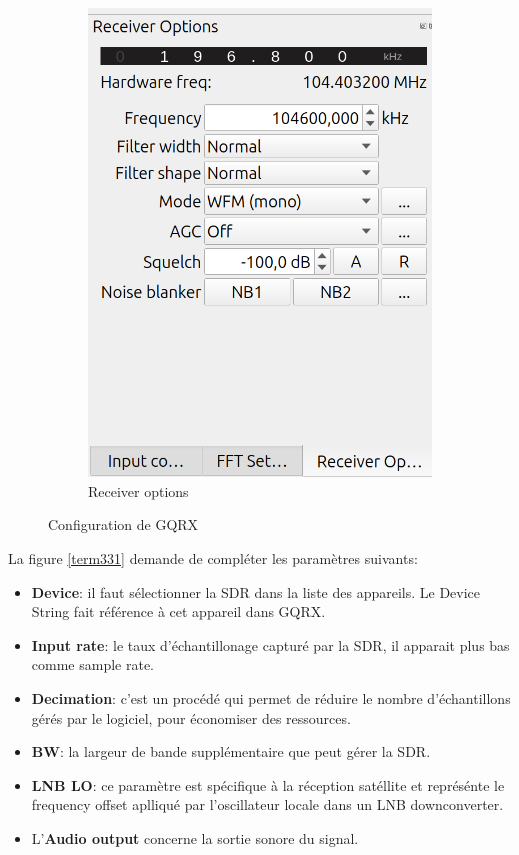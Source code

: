 \begin{figure}[h]
\begin{subfigure}{0.35\textwidth}
  \includegraphics[width=\textwidth]{images/gqrx3.png}
  \caption{Receiver options}
  \label{term341}
\end{subfigure}
\caption{Configuration de GQRX}
\label{term37}
\end{figure}

La figure \ref{term331} demande de compléter les paramètres suivants:

\vspace{0.1cm}

\begin{itemize}
\item \textbf{Device}: il faut sélectionner la SDR dans la liste des appareils. Le Device String fait référence à cet appareil dans GQRX.
\item \textbf{Input rate}: le taux d'échantillonage capturé par la \ac{SDR}, il apparait plus bas comme sample rate.
\item \textbf{Decimation}: c'est un procédé qui permet de réduire le nombre d'échan\-tillons gérés par le logiciel, pour économiser des ressources.
\item \textbf{\ac{BW}}: la largeur de bande supplémentaire que peut gérer la SDR.
\item \textbf{\ac{LNB LO}}: ce paramètre est spécifique à la réception satéllite et représénte le frequency offset aplliqué par l'oscillateur locale dans un LNB downconverter.
\item L'\textbf{Audio output} concerne la sortie sonore du signal.
\end{itemize}

